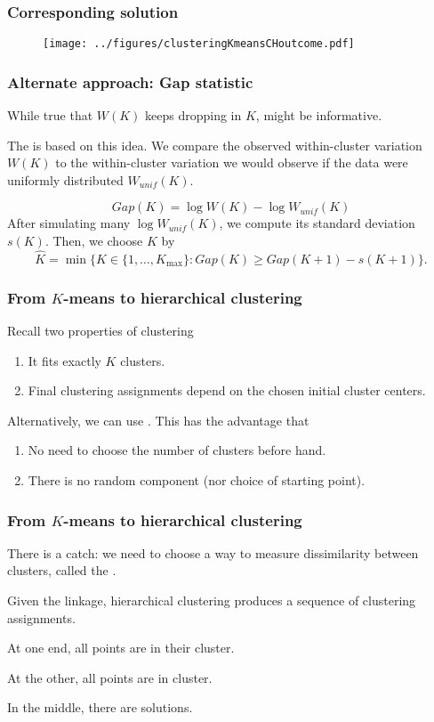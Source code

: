 \documentclass{beamer}
\begin{document}
\begin{frame}[fragile]
\frametitle{Corresponding solution}
\begin{figure}[h!]
  \centering
  \texttt{[image: ../figures/clusteringKmeansCHoutcome.pdf]}  
\end{figure}
\end{frame}

\begin{frame}[fragile]
\frametitle{Alternate approach: Gap statistic}
While true that $W(K)$ keeps dropping in $K$,  might be informative.

\vsp
The  is based on this idea.  We compare the observed within-cluster variation
$W(K)$ to the within-cluster variation we would observe if the data were uniformly distributed $W_{unif}(K)$.

\[
Gap(K) = \log W(K) - \log W_{unif}(K)
\]
After simulating many $\log W_{unif}(K)$, we compute its standard deviation $s(K)$.  Then, we choose
$K$ by
\[
\hat K = \min\{ K \in \{1,\ldots,K_{\max} \} : Gap(K) \geq Gap(K+1) - s(K+1) \}.
\]
\end{frame}

\begin{frame}
\frametitle{From $K$-means to hierarchical clustering}
Recall two properties of  clustering
\begin{enumerate}
\item It fits exactly $K$ clusters.
\item Final clustering assignments depend on the chosen initial cluster centers.
\end{enumerate}
\vsp

Alternatively, we can use .  This has the advantage that
\begin{enumerate}
\item No need to choose the number of clusters before hand.
\item There is no random component (nor choice of starting point).
\end{enumerate}
\end{frame}
\begin{frame}
\frametitle{From $K$-means to hierarchical clustering}

There is a catch: we need to choose a way to measure dissimilarity between clusters, called the .

\vsp
Given the linkage, hierarchical clustering produces a sequence of clustering assignments.  

\vsp
At one end, all points are in their  cluster.  

\vsp
At the other, all points are in  cluster.  

\vsp
In the middle, there are  solutions.
\end{frame}
\end{document}
